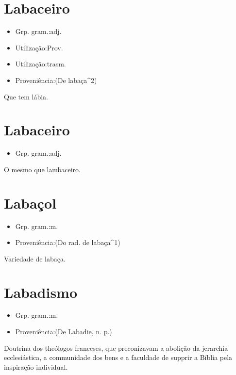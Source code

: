 \section{Labaceiro}
\begin{itemize}
\item {Grp. gram.:adj.}
\end{itemize}
\begin{itemize}
\item {Utilização:Prov.}
\end{itemize}
\begin{itemize}
\item {Utilização:trasm.}
\end{itemize}
\begin{itemize}
\item {Proveniência:(De \textunderscore labaça\textunderscore ^2)}
\end{itemize}
Que tem lábia.
\section{Labaceiro}
\begin{itemize}
\item {Grp. gram.:adj.}
\end{itemize}
O mesmo que \textunderscore lambaceiro\textunderscore .
\section{Labaçol}
\begin{itemize}
\item {Grp. gram.:m.}
\end{itemize}
\begin{itemize}
\item {Proveniência:(Do rad. de \textunderscore labaça\textunderscore ^1)}
\end{itemize}
Variedade de labaça.
\section{Labadismo}
\begin{itemize}
\item {Grp. gram.:m.}
\end{itemize}
\begin{itemize}
\item {Proveniência:(De \textunderscore Labadie\textunderscore , n. p.)}
\end{itemize}
Doutrina dos theólogos franceses, que preconizavam a abolição da jerarchia ecclesiástica, a communidade dos bens e a faculdade de supprir a Bíblia pela inspiração individual.
